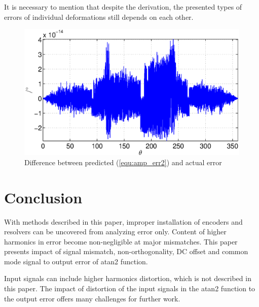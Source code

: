 \documentclass[a4paper]{article}
\begin{document}
It is necessary to mention that despite the derivation, the presented types of errors of individual deformations still depends on each other.
\begin{figure}[!htb]
	\begin{center}
		\includegraphics[width=\linewidth]{./Slike/razlika_amp.eps}
		\caption{Difference between predicted (\ref{equ:amp_err2}) and actual error} \label{fig:razlika}
	\end{center}
\end{figure}

\section{Conclusion}
With methods described in this paper, improper installation of encoders and resolvers can be uncovered from analyzing error only.
Content of higher harmonics in error become non-negligible at major mismatches. This paper presents impact of signal mismatch, non-orthogonality, DC offset and common mode signal to output error of atan2 function.

Input signals can include higher harmonics distortion, which is not described in this paper. The impact of distortion of the input signals in the atan2 function to the output error offers many challenges for further work. 
\small
\end{document}
